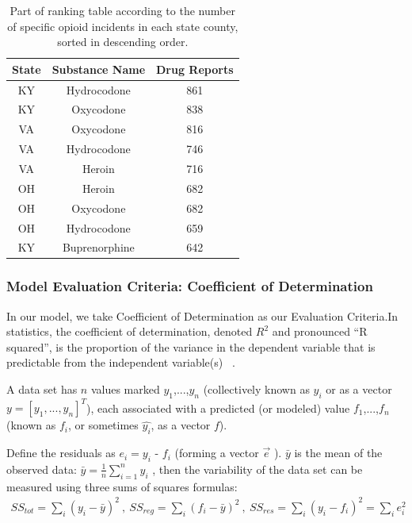 \documentclass{mcmthesis}
\begin{document}
\begin{table}[H]
    \centering  
    \caption{Part of ranking table according to the number of specific opioid incidents in each state county, sorted in descending order.}
    \label{tab:my_label}
    \begin{tabular}{|c|c|c|}
        \hline
        State & Substance Name & Drug Reports \\\hline
        KY & Hydrocodone & 861 \\
        KY & Oxycodone & 838 \\
        VA & Oxycodone & 816 \\
        VA & Hydrocodone & 746 \\
        VA & Heroin & 716 \\
        OH & Heroin & 682 \\
        OH & Oxycodone & 682 \\
        OH & Hydrocodone & 659 \\
        KY & Buprenorphine & 642 \\\hline
    \end{tabular}
\end{table}    
    
    

\subsubsection{Model Evaluation Criteria:  Coefficient of Determination}
    
    In our model, we take  Coefficient of Determination as our Evaluation Criteria.In statistics, the coefficient of determination, denoted $R^2$ and pronounced ``R squared'', is the proportion of the variance in the dependent variable that is predictable from the independent variable(s) ~\cite{R}. 
    
    A data set has $n$ values marked $y_1$,...,$y_n$ (collectively known as $y_i$ or as a vector $y = [y_1,...,y_n]^T$), each associated with a predicted (or modeled) value $f_1$,...,$f_n$ (known as $f_i$, or sometimes $\hat{y_i}$, as a vector $f$).

    Define the residuals as $e_i = y_i$ - $f_i$ (forming a vector $\vec{e}$ ). $\bar{y}$ is the mean of the observed data: 
    $\bar{y}=\frac{1}{n}\sum_{i=1}^n y_{i}$ , then the variability of the data set can be measured using three sums of squares formulas:
    \begin{gather*}
        SS_{tot}=\sum _{i} \left ( y_i-\bar{y} \right )^2 ~,~
         SS_{reg}=\sum _{i} \left ( f_i-\bar{y} \right )^2 ~,~
       SS_{res}=\sum _{i} \left ( y_i-f_i \right )^2=\sum _{i}e_i^2
     \end{gather*}
     
\end{document}
